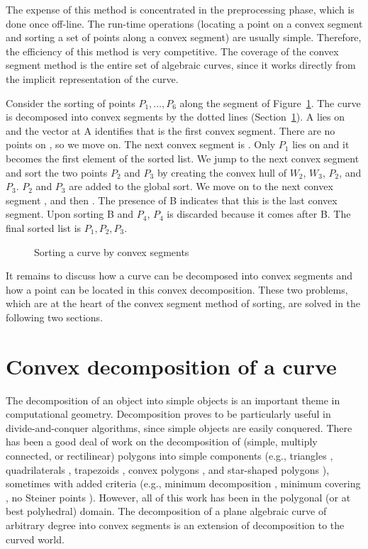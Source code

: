 The expense of this method is concentrated in the preprocessing phase, which
is done once off-line. 
The run-time operations (locating a point on a convex segment and
sorting a set of points along a convex segment) are usually simple.
Therefore, the efficiency of this method is very competitive.
The coverage of the convex segment method is the entire set of algebraic curves,
since it works directly from the implicit representation of the curve.

\begin{example}
Consider the sorting of points $P_{1}, \ldots, P_{6}$ 
along the segment  of Figure~\ref{2.12a}.
The curve is decomposed into convex segments by the dotted lines 
(Section~\ref{s-dec}).
A lies on  and
the vector at A identifies that  is the first convex segment.
There are no points on , so we move on.
The next convex segment is \arc{\wo\wt}.
Only $P_{1}$ lies on \arc{\wo\wt} and it becomes the first element of the 
sorted list.
We jump to the next convex segment  and
sort the two points $P_{2}$ and $P_{3}$ 
by creating the convex hull of $W_{2}$, $W_{3}$, $P_{2}$, and $P_{3}$.
$P_{2}$ and $P_{3}$ are added to the global sort.
We move on to the next convex segment , and then .
The presence of B indicates that this is the last convex segment.
Upon sorting B and $P_{4}$, $P_{4}$ is discarded because it comes after B.
The final sorted list is $P_{1},P_{2},P_{3}$.
\end{example}

\begin{figure}[htbp]\vspace{2.75in}\caption{Sorting a curve by convex segments}\label{2.12a}\end{figure}

It remains to discuss how a curve can be decomposed into convex segments and
how a point can be located in this convex decomposition.
These two problems, which are at the heart of the convex segment method 
of sorting, are solved in the following two sections.

\section{Convex decomposition of a curve}
\label{s-dec}
%
The decomposition of an object into simple objects is an important theme
in computational geometry.
Decomposition proves to be particularly useful in divide-and-conquer algorithms, 
since simple objects are easily conquered.
There has been a good deal of work on the decomposition of 
(simple, multiply connected, or rectilinear) polygons into simple components
(e.g., triangles \cite{CI,G,H,T}, quadrilaterals \cite{S}, 
trapezoids \cite{As}, convex polygons  \cite{cd,tm}, and star-shaped 
polygons \cite{Av}), sometimes with added criteria (e.g., minimum decomposition 
\cite{cd,keil}, minimum covering \cite{O}, no Steiner points \cite{keil}).
However, all of this work has been in the polygonal (or at best polyhedral) 
domain.
The decomposition of a plane algebraic curve of arbitrary degree into convex 
segments is an extension of decomposition to the curved world.

